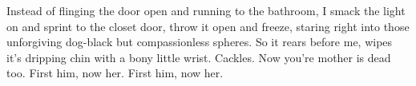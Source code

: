 Instead of flinging the door open and running to the bathroom, I
smack the light on and sprint to the closet door, throw it open and
freeze, staring right into those unforgiving dog-black but
compassionless spheres. So it rears before me, wipes it's
dripping chin with a bony little wrist. Cackles. Now you're
mother is dead too. First him, now her. First him, now her. 

 



